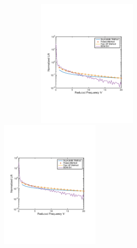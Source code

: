 \documentclass{article}
\begin{document}
\begin{figure}[h]
\centering
\begin{minipage}{0.5\textwidth}
	\centering
	\includegraphics[width = 3.5in, height = 2.5in]{NACA2103}
\end{minipage}%
\begin{minipage}{0.5\textwidth}
	\centering
	\includegraphics[width = 3.2 in, height = 2.5in]{NACA2403}
\end{minipage}%
\end{figure}
\end{document}

